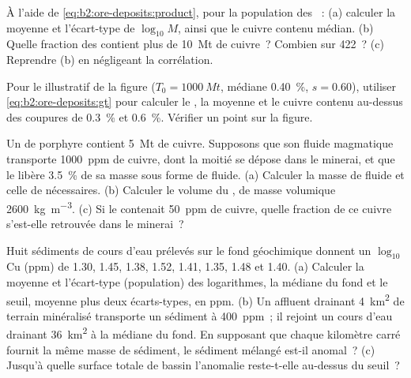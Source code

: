 \begin{exercise}[$\star\star$]\label{exo:b2:ore-deposits:6}
À l'aide de \eqref{eq:b2:ore-deposits:product}, pour la population des ~: (a) calculer
la moyenne et l'écart-type de $\log_{10} M$, ainsi que le cuivre contenu médian. (b) Quelle fraction des 
contient plus de \qty{10}{Mt} de cuivre~? Combien sur 422~? (c) Reprendre (b) en négligeant la corrélation.
\end{exercise}

\begin{exercise}[$\star\star$]\label{exo:b2:ore-deposits:7}
Pour le  illustratif de la figure ($T_0 = \qty{1000}{Mt}$, médiane \qty{0.40}{\percent}, $s = 0.60$),
utiliser \eqref{eq:b2:ore-deposits:gt} pour calculer le , la  moyenne et le cuivre contenu
au-dessus des coupures de \qty{0.3}{\percent} et \qty{0.6}{\percent}. Vérifier un point sur la figure.
\end{exercise}

\begin{exercise}[$\star\star$]\label{exo:b2:ore-deposits:8}
Un  de porphyre contient \qty{5}{Mt} de cuivre. Supposons que son fluide magmatique transporte
\qty{1000}{ppm} de cuivre, dont la moitié se dépose dans le minerai, et que le  libère \qty{3.5}{\percent}
de sa masse sous forme de fluide. (a) Calculer la masse de fluide et celle de  nécessaires.
(b) Calculer le volume du , de masse volumique \qty{2600}{kg.m^{-3}}. (c) Si le  contenait
\qty{50}{ppm} de cuivre, quelle fraction de ce cuivre s'est-elle retrouvée dans le minerai~?
\end{exercise}

\begin{exercise}[$\star\star$]\label{exo:b2:ore-deposits:9}
Huit sédiments de cours d'eau prélevés sur le fond géochimique donnent un $\log_{10}$ Cu (ppm)
de 1.30, 1.45, 1.38, 1.52, 1.41, 1.35, 1.48 et 1.40. (a) Calculer la moyenne et l'écart-type (population)
des logarithmes, la médiane du fond et le seuil, moyenne plus deux écarts-types, en
ppm. (b) Un affluent drainant \qty{4}{km^2} de terrain minéralisé transporte un sédiment à \qty{400}{ppm}~;
il rejoint un cours d'eau drainant \qty{36}{km^2} à la médiane du fond. En supposant
que chaque kilomètre carré fournit la même masse de sédiment, le sédiment mélangé est-il anomal~?
(c) Jusqu'à quelle surface totale de bassin l'anomalie reste-t-elle au-dessus du seuil~?
\end{exercise}

